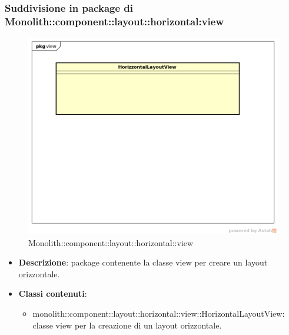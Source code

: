 \subsubsection{Suddivisione in package  di Monolith::component::layout::horizontal:view}
\label{Monolith::component::layout::horizontal::view}
\begin{figure}[H]
	\centering
	\includegraphics[scale=0.5]{Sezioni/imgPackage/component_layout_horizontal_view.png}
	\caption{Monolith::component::layout::horizontal::view}
\end{figure}
\begin{itemize}
	\item{\textbf{Descrizione}}: package contenente la classe view per creare un layout orizzontale.
	\item{\textbf{Classi contenuti}}:
	\begin{itemize}
	\item{monolith::component::layout::horizontal::view::HorizontalLayoutView}: classe view per la creazione di un layout orizzontale.
	\end{itemize}
\end{itemize}

